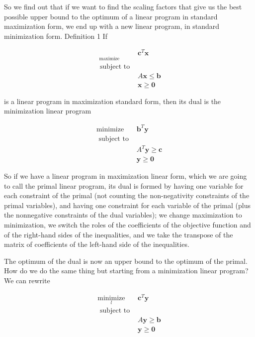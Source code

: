 So we find out that if we want to find the scaling factors that give us the best possible upper bound to the optimum of a linear program in standard maximization form, we end up with a new linear program, in standard minimization form. Definition 1 If

$$
\begin{array}{ll}
\underset{\text { maximize }}{ } & \mathbf{c}^{T} \mathbf{x} \\
\text { subject to } & \\
& A \mathbf{x} \leq \mathbf{b} \\
& \mathbf{x} \geq \mathbf{0}
\end{array}
$$

is a linear program in maximization standard form, then its dual is the minimization linear program

$$
\begin{array}{ll}
\operatorname{minimize} & \mathbf{b}^{T} \mathbf{y} \\
\text { subject to } & \\
& A^{T} \mathbf{y} \geq \mathbf{c} \\
& \mathbf{y} \geq \mathbf{0}
\end{array}
$$

So if we have a linear program in maximization linear form, which we are going to call the primal linear program, its dual is formed by having one variable for each constraint of the primal (not counting the non-negativity constraints of the primal variables), and having one constraint for each variable of the primal (plus the nonnegative constraints of the dual variables); we change maximization to minimization, we switch the roles of the coefficients of the objective function and of the right-hand sides of the inequalities, and we take the transpose of the matrix of coefficients of the left-hand side of the inequalities.

The optimum of the dual is now an upper bound to the optimum of the primal. How do we do the same thing but starting from a minimization linear program? We can rewrite

$$
\begin{array}{ll}
\underset{l}{\operatorname{minimize}} & \mathbf{c}^{T} \mathbf{y} \\
\text { subject to } & \\
& A \mathbf{y} \geq \mathbf{b} \\
& \mathbf{y} \geq \mathbf{0}
\end{array}
$$

